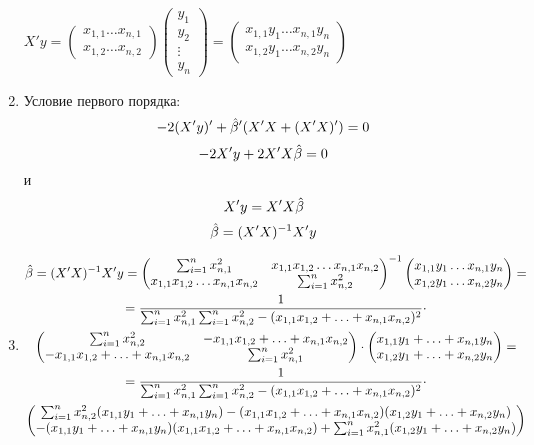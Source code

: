 \begin{problem}
\begin{sol}
\begin{enumerate}
$X'y=\begin{pmatrix}
x_{1,1}\ldots x_{n,1}\\
x_{1,2}\ldots x_{n,2}
\end{pmatrix}
\begin{pmatrix}
y_1\\
y_2\\
\vdots\\
y_n
\end{pmatrix}=
\begin{pmatrix}
x_{1,1}y_1\ldots x_{n,1}y_n\\
x_{1,2}y_1\ldots x_{n,2}y_n
\end{pmatrix}$

\item
Условие первого порядка:
\[-2(X'y)'+\hat{\beta}'(X'X+(X'X)')=0\]
\[-2X'y+2X'X \hat{\beta} =0\]
и
\[X'y=X'X\hat{\beta}\]
\[\hat{\beta}=(X'X)^{-1}X'y\]

\item
\begin{multline*}
\hat{\beta}=(X'X)^{-1}X'y=
\begin{pmatrix}
\sum_{i=1}^n x^2_{n,1}& x_{1,1}x_{1,2}\ldots x_{n,1}x_{n,2}\\
x_{1,1}x_{1,2}\ldots x_{n,1}x_{n,2}&\sum_{i=1}^nx^2_{n,2}
\end{pmatrix}^{-1}
\begin{pmatrix}
x_{1,1}y_1\ldots x_{n,1}y_n\\
x_{1,2}y_1\ldots x_{n,2}y_n
\end{pmatrix}=\\
=\frac{1}{\sum_{i=1}^n x^2_{n,1}\sum_{i=1}^n x^2_{n,2}-(x_{1,1}x_{1,2}+\ldots+ x_{n,1}x_{n,2})^2}\cdot\\
\begin{pmatrix}
\sum_{i=1}^n x^2_{n,2}& -x_{1,1}x_{1,2}+\ldots+ x_{n,1}x_{n,2}\\
-x_{1,1}x_{1,2}+\ldots +x_{n,1}x_{n,2}&\sum_{i=1}^nx^2_{n,1}
\end{pmatrix}
\cdot
\begin{pmatrix}
x_{1,1}y_1+\ldots +x_{n,1}y_n\\
x_{1,2}y_1+\ldots +x_{n,2}y_n
\end{pmatrix}=\\
=\frac{1}{\sum_{i=1}^n x^2_{n,1}\sum_{i=1}^n x^2_{n,2}-(x_{1,1}x_{1,2}+\ldots+ x_{n,1}x_{n,2})^2}\cdot\\
\begin{pmatrix}
\sum_{i=1}^n x^2_{n,2}(x_{1,1}y_1+\ldots +x_{n,1}y_n) -(x_{1,1}x_{1,2}+\ldots+ x_{n,1}x_{n,2})(x_{1,2}y_1+\ldots +x_{n,2}y_n)\\
-(x_{1,1}y_1+\ldots +x_{n,1}y_n)(x_{1,1}x_{1,2}+\ldots +x_{n,1}x_{n,2})+\sum_{i=1}^nx^2_{n,1}(x_{1,2}y_1+\ldots +x_{n,2}y_n)
\end{pmatrix}
\end{multline*}
\end{enumerate}
\end{sol}
\end{problem}




